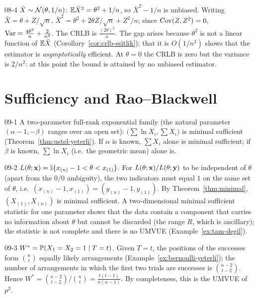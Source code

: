 \begin{solution}{08-4}
$\bar X\sim\Normal(\theta,1/n)$: $\E\bar X^2=\theta^2+1/n$, so $\bar X^2-1/n$ is unbiased. Writing $\bar X=\theta+Z/\sqrt n$, $\bar X^2=\theta^2+2\theta Z/\sqrt n+Z^2/n$; since $\Cov(Z,Z^2)=0$, $\Var=\frac{4\theta^2}{n}+\frac{2}{n^2}$. The CRLB is $\frac{(2\theta)^2}{n}$. The gap arises because $\theta^2$ is not a linear function of $\E\bar X$ (Corollary~\ref{cor:crlb-esitlik}); that it is $O(1/n^2)$ shows that the estimator is \emph{asymptotically} efficient. At $\theta=0$ the CRLB is zero but the variance is $2/n^2$: at this point the bound is attained by no unbiased estimator.
\end{solution}

\section{Sufficiency and Rao--Blackwell}

\begin{solution}{09-1}
A two-parameter full-rank exponential family (the natural parameter $(\alpha-1,-\beta)$ ranges over an open set): $\big(\sum\ln X_i,\sum X_i\big)$ is minimal sufficient (Theorem~\ref{thm:ustel-yeterli}). If $\alpha$ is known, $\sum X_i$ alone is minimal sufficient; if $\beta$ is known, $\sum\ln X_i$ (i.e.\ the geometric mean) alone is.
\end{solution}

\begin{solution}{09-2}
$L(\theta;\x)=\I\{x_{(n)}-1<\theta<x_{(1)}\}$. For $L(\theta;\x)/L(\theta;\mathbf y)$ to be independent of $\theta$ (apart from the $0/0$ ambiguity), the two indicators must equal $1$ on the same set of $\theta$, i.e.\ $(x_{(n)}-1,x_{(1)})=(y_{(n)}-1,y_{(1)})$. By Theorem~\ref{thm:minimal}, $(X_{(1)},X_{(n)})$ is minimal sufficient. A two-dimensional minimal sufficient statistic for one parameter shows that the data contain a component that carries no information about $\theta$ but cannot be discarded (the range $R$, which is ancillary); the statistic is not complete and there is no UMVUE (Example~\ref{ex:tam-degil}).
\end{solution}

\begin{solution}{09-3}
$W^*=\P(X_1=X_2=1\mid T=t)$. Given $T=t$, the positions of the successes form $\binom nt$ equally likely arrangements (Example~\ref{ex:bernoulli-yeterli}); the number of arrangements in which the first two trials are successes is $\binom{n-2}{t-2}$. Hence
$W^*=\binom{n-2}{t-2}\big/\binom nt=\frac{t(t-1)}{n(n-1)}$. By completeness, this is the UMVUE of $p^2$.
\end{solution}

